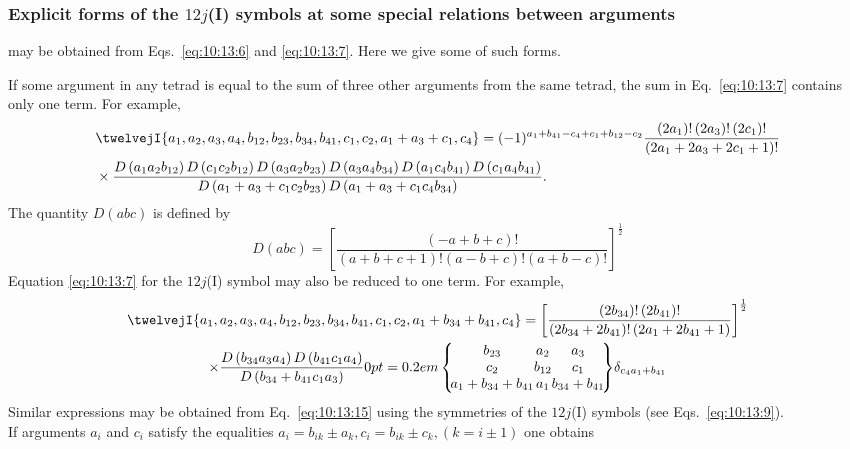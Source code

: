 \subsubsection{Explicit forms of the $12j$(I) symbols at some special relations between arguments}
may be obtained from Eqs.~\eqref{eq:10:13:6} and \eqref{eq:10:13:7}. Here we give some of such forms.

If some argument in any tetrad is equal to the sum of three other arguments from the same tetrad, the sum in Eq.~\eqref{eq:10:13:7} contains only one term. For example,
\begin{align}
& \twelvejI{a_{1},a_{2},a_{3},a_{4},b_{12},b_{23},b_{34},b_{41},c_{1},c_{2},a_{1}+a_{3}+c_{1},c_{4}}=(-1)^{a_{1}+b_{41}-c_{4}+c_{1}+b_{12}-c_{2}} \frac{\left(2 a_{1}\right)!\left(2 a_{3}\right)!\left(2 c_{1}\right)!}{\left(2 a_{1}+2 a_{3}+2 c_{1}+1\right)!}  \notag\\
& \times \frac{D\left(a_{1} a_{2} b_{12}\right) D\left(c_{1} c_{2} b_{12}\right) D\left(a_{3} a_{2} b_{23}\right) D\left(a_{3} a_{4} b_{34}\right) D\left(a_{1} c_{4} b_{41}\right) D\left(c_{1} a_{4} b_{41}\right)}{D\left(a_{1}+a_{3}+c_{1} c_{2} b_{23}\right) D\left(a_{1}+a_{3}+c_{1} c_{4} b_{34}\right)} . \label{eq:10:13:13}
\end{align}
The quantity $D(a b c)$ is defined by
\begin{equation}
D(a b c)=\left[\frac{(-a+b+c)!}{(a+b+c+1)!(a-b+c)!(a+b-c)!}\right]^{\frac{1}{2}} \label{eq:10:13:14}
\end{equation}
Equation \eqref{eq:10:13:7} for the $12j$(I) symbol may also be reduced to one term. For example,
\begin{gather}
\twelvejI{a_{1},a_{2},a_{3},a_{4},b_{12},b_{23},b_{34},b_{41},c_{1},c_{2},a_{1}+b_{34}+b_{41},c_{4}}=\left[\frac{\left(2 b_{34}\right)!\left(2 b_{41}\right)!}{\left(2 b_{34}+2 b_{41}\right)!\left(2 a_{1}+2 b_{41}+1\right)}\right]^{\frac{1}{2}}  \notag\\
\times \frac{D\left(b_{34} a_{3} a_{4}\right) D\left(b_{41} c_{1} a_{4}\right)}{D\left(b_{34}+b_{41} c_{1} a_{3}\right)}\ninej{b_{23}}{a_{2}}{a_{3}}{c_{2}}{b_{12}}{c_{1}}{a_{1}+b_{34}+b_{41}}{a_{1}}{b_{34}+b_{41}} \delta_{c_{4} a_{1}+b_{41}} \label{eq:10:13:15}
\end{gather}
Similar expressions may be obtained from Eq.~\eqref{eq:10:13:15} using the symmetries of the $12j$(I) symbols (see Eqs.~\eqref{eq:10:13:9}).\\
If arguments $a_{i}$ and $c_{i}$ satisfy the equalities $a_{i}=b_{i k} \pm a_{k}, c_{i}=b_{i k} \pm c_{k},(k=i \pm 1)$ one obtains
